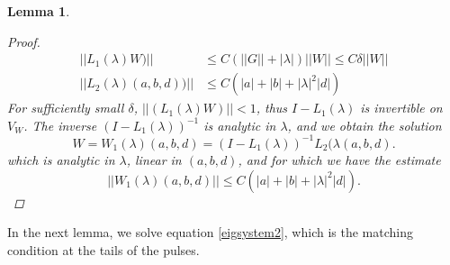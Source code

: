 \documentclass[12pt]{article}
\newtheorem{lemma}{Lemma}
\begin{document}
\begin{lemma}
\begin{proof}
\begin{align*}
||L_1(\lambda)W)|| &\leq C \left(||G|| + |\lambda| \right)||W|| \leq C \delta ||W|| \\
||L_2(\lambda)(a,b,d))|| &\leq C\left( |a| + |b| + |\lambda|^2 |d| \right)
\end{align*}
For sufficiently small $\delta$, $||(L_1(\lambda)W)|| < 1$, thus $I - L_1(\lambda)$ is invertible on $V_W$. The inverse $(I - L_1(\lambda))^{-1}$ is analytic in $\lambda$, and we obtain the solution 
\[
W = W_1(\lambda)(a,b,d) = (I - L_1(\lambda))^{-1} L_2(\lambda(a,b,d).
\]
which is analytic in $\lambda$, linear in $(a, b, d)$, and for which we have the estimate
\begin{equation*}
||W_1(\lambda)(a,b,d)|| \leq C \left( |a| + |b| + |\lambda|^2 |d| \right).
\end{equation*}
\end{proof}
\end{lemma}

In the next lemma, we solve equation \eqref{eigsystem2}, which is the matching condition at the tails of the pulses.
\end{document}
